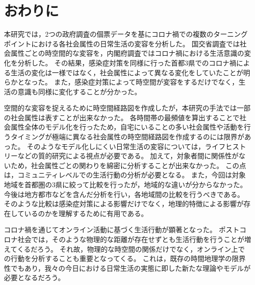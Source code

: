 \documentclass[paper={210mm,297mm},fontsize=15Q,line_length=35zw,number_of_lines=31,head_space=30mm,gutter=40mm,baselineskip=2.0zw,headfoot_verticalposition=1.5zw]{jlreq}
\begin{document}
\section{おわりに}

本研究では，2つの政府調査の個票データを基にコロナ禍での複数のターニングポイントにおける各社会属性の日常生活の変容を分析した。
国交省調査では社会属性ごとの時空間的な変容を，内閣府調査ではコロナ禍における生活意識の変化を分析した。
その結果，感染症対策を同様に行った首都3県でのコロナ禍による生活の変化は一様ではなく，社会属性によって異なる変化をしていたことが明らかとなった。
また，感染症対策によって時空間が変容をするだけでなく，生活の意識も同様に変化することが分かった。

空間的な変容を捉えるために時空間経路図を作成したが，本研究の手法では一部の社会属性は表すことが出来なかった。
各時間帯の最頻値を算出することで社会属性全体のモデル化を行ったため，自宅にいることの多い社会属性や活動を行うタイミングが極端に異なる社会属性の時空間経路図を作成するのには限界があった。
そのようなモデル化しにくい日常生活の変容については，ライフヒストリーなどの質的研究による視点が必要である。
加えて，対象者間に関係性がないため，社会属性ごとの関わりを綿密に分析することが出来なかった。
この点は，コミュニティレベルでの生活行動の分析が必要となる。
また，今回は対象地域を首都圏の3県に絞って比較を行ったが，地域的な違いが分からなかった。
今後は地方都市などを含んだ分析を行い，各地域間の比較を行うべきである。
そのような比較は感染症対策による影響だけでなく，地理的特徴による影響が存在しているのかを理解するために有用である。

コロナ禍を通じてオンライン活動に基づく生活行動が顕著となった。
ポストコロナ社会では，そのような物理的な距離が存在せずとも生活行動を行うことが増えてくるだろう。
それ故，物理的な時空間の関係だけでなく，オンライン上での行動を分析することも重要となってくる。
これは，既存の時間地理学の限界性でもあり，我々の今日における日常生活の実態に即した新たな理論やモデルが必要となるだろう。
\end{document}
